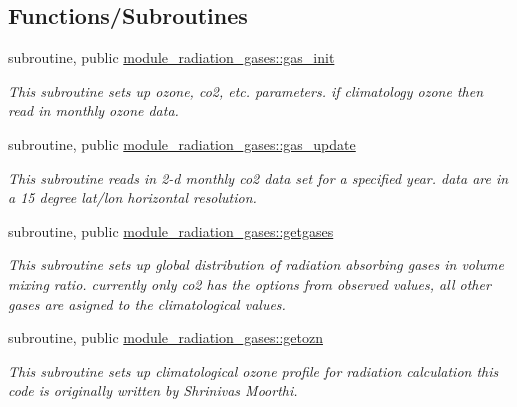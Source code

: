 \subsection*{Functions/\+Subroutines}
\begin{DoxyCompactItemize}
\item 
subroutine, public \hyperlink{group__module__radiation__gases_ga9b1b02edc81d3ef240e22cdaf4c7e7c1}{module\+\_\+radiation\+\_\+gases\+::gas\+\_\+init}
\begin{DoxyCompactList}\small\item\em This subroutine sets up ozone, co2, etc. parameters. if climatology ozone then read in monthly ozone data. \end{DoxyCompactList}\item 
subroutine, public \hyperlink{group__module__radiation__gases_gad47ebb37ff002f7a2f4fb83b0073a172}{module\+\_\+radiation\+\_\+gases\+::gas\+\_\+update}
\begin{DoxyCompactList}\small\item\em This subroutine reads in 2-\/d monthly co2 data set for a specified year. data are in a 15 degree lat/lon horizontal resolution. \end{DoxyCompactList}\item 
subroutine, public \hyperlink{group__module__radiation__gases_gad06401a54d361b3dd852d815d1b0f71e}{module\+\_\+radiation\+\_\+gases\+::getgases}                                                                                           
\begin{DoxyCompactList}\small\item\em This subroutine sets up global distribution of radiation absorbing gases in volume mixing ratio. currently only co2 has the options from observed values, all other gases are asigned to the climatological values. \end{DoxyCompactList}\item 
subroutine, public \hyperlink{group__module__radiation__gases_gad43e55be9ef69dc68577237e9ce0f127}{module\+\_\+radiation\+\_\+gases\+::getozn}
\begin{DoxyCompactList}\small\item\em This subroutine sets up climatological ozone profile for radiation calculation this code is originally written by Shrinivas Moorthi. \end{DoxyCompactList}\end{DoxyCompactItemize}
